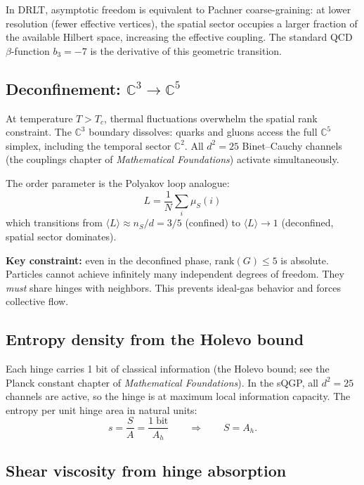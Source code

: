 \documentclass[12pt]{article}
\theoremstyle{remark}
\theoremstyle{definition}
\newcommand{\CC}{\mathbb{C}}
\begin{document}
In DRLT, asymptotic freedom is equivalent to Pachner coarse-graining: at lower resolution (fewer effective vertices), the spatial sector occupies a larger fraction of the available Hilbert space, increasing the effective coupling. The standard QCD $\beta$-function $b_3 = -7$ is the derivative of this geometric transition.

\subsection{Deconfinement: $\CC^3 \to \CC^5$}

At temperature $T > T_c$, thermal fluctuations overwhelm the spatial rank constraint. The $\CC^3$ boundary dissolves: quarks and gluons access the full $\CC^5$ simplex, including the temporal sector $\CC^2$. All $d^2 = 25$ Binet--Cauchy channels (the couplings chapter of \textit{Mathematical Foundations}) activate simultaneously.

The order parameter is the Polyakov loop analogue:
\begin{equation}
L = \frac{1}{N}\sum_i \mu_S(i)
\end{equation}
which transitions from $\langle L\rangle \approx n_S/d = 3/5$ (confined) to $\langle L\rangle \to 1$ (deconfined, spatial sector dominates).

\textbf{Key constraint:} even in the deconfined phase, $\text{rank}(G) \leq 5$ is absolute. Particles cannot achieve infinitely many independent degrees of freedom. They \emph{must} share hinges with neighbors. This prevents ideal-gas behavior and forces collective flow.

\subsection{Entropy density from the Holevo bound}

Each hinge carries 1 bit of classical information (the Holevo bound; see the Planck constant chapter of \textit{Mathematical Foundations}). In the sQGP, all $d^2 = 25$ channels are active, so the hinge is at maximum local information capacity. The entropy per unit hinge area in natural units:
\begin{equation}
s = \frac{S}{A} = \frac{1\;\text{bit}}{A_h} \qquad\Rightarrow\qquad S = A_h.
\end{equation}

\subsection{Shear viscosity from hinge absorption}
\end{document}

